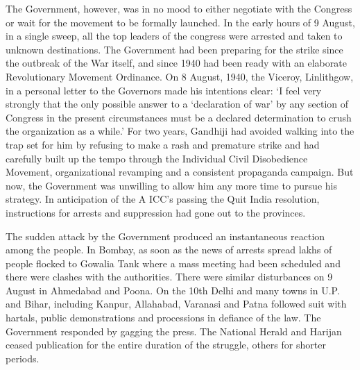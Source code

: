 \begin{multicols}{2}
The Government, however, was in no mood to either negotiate with the Congress or wait for the movement to be formally launched. In the early hours of 9 August, in a single sweep, all the top leaders of the congress were arrested and taken to unknown destinations. The Government had been preparing for the strike since the outbreak of the War itself, and since 1940 had been ready with an elaborate Revolutionary Movement Ordinance. On 8 August, 1940, the Viceroy, Linlithgow, in a personal letter to the Governors made his intentions clear: `I feel very strongly that the only possible answer to a `declaration of war' by any section of Congress in the present circumstances must be a declared determination to crush the organization as a while.' For two years, Gandhiji had avoided walking into the trap set for him by refusing to make a rash and premature strike and had carefully built up the tempo through the Individual Civil Disobedience Movement, organizational revamping and a consistent propaganda campaign. But now, the Government was unwilling to allow him any more time to pursue his strategy. In anticipation of the A ICC's passing the Quit India resolution, instructions for arrests and suppression had gone out to the provinces.

The sudden attack by the Government produced an instantaneous reaction among the people. In Bombay, as soon as the news of arrests spread lakhs of people flocked to Gowalia Tank where a mass meeting had been scheduled and there were clashes with the authorities. There were similar disturbances on 9 August in Ahmedabad and Poona. On the 10th Delhi and many towns in U.P. and Bihar, including Kanpur, Allahabad, Varanasi and Patna followed suit with hartals, public demonstrations and processions in defiance of the law. The Government responded by gagging the press. The National Herald and Harijan ceased publication for the entire duration of the struggle, others for shorter periods.


\end{multicols}
